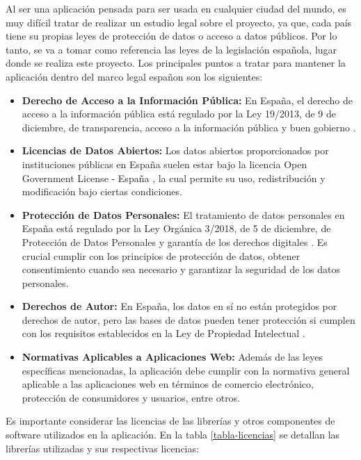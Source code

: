 Al ser una aplicación pensada para ser usada en cualquier ciudad del mundo, es muy difícil tratar de realizar un estudio legal sobre el proyecto, ya que, cada país tiene su propias leyes de protección de datos o acceso a datos públicos. Por lo tanto, se va a tomar como referencia las leyes de la legislación española, lugar donde se realiza este proyecto.
Los principales puntos a tratar para mantener la aplicación dentro del marco legal españon son los siguientes:
\begin{itemize}
    \item \textbf{Derecho de Acceso a la Información Pública:} En España, el derecho de acceso a la información pública está regulado por la Ley 19/2013, de 9 de diciembre, de transparencia, acceso a la información pública y buen gobierno \cite{ley-transparencia}.

    \item \textbf{Licencias de Datos Abiertos:} Los datos abiertos proporcionados por instituciones públicas en España suelen estar bajo la licencia Open Government License - España \cite{ogl-es}, la cual permite su uso, redistribución y modificación bajo ciertas condiciones.

    \item \textbf{Protección de Datos Personales:} El tratamiento de datos personales en España está regulado por la Ley Orgánica 3/2018, de 5 de diciembre, de Protección de Datos Personales y garantía de los derechos digitales \cite{lopdgdd}. Es crucial cumplir con los principios de protección de datos, obtener consentimiento cuando sea necesario y garantizar la seguridad de los datos personales.

    \item \textbf{Derechos de Autor:} En España, los datos en sí no están protegidos por derechos de autor, pero las bases de datos pueden tener protección si cumplen con los requisitos establecidos en la Ley de Propiedad Intelectual \cite{lpi}.

    \item \textbf{Normativas Aplicables a Aplicaciones Web:} Además de las leyes específicas mencionadas, la aplicación debe cumplir con la normativa general aplicable a las aplicaciones web en términos de comercio electrónico, protección de consumidores y usuarios, entre otros.
\end{itemize}

Es importante considerar las licencias de las librerías y otros componentes de software utilizados en la aplicación. En la tabla \ref{tabla-licencias} se detallan las librerías utilizadas y sus respectivas licencias:

